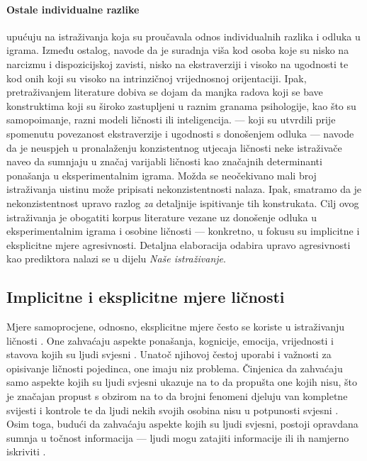 \documentclass[a4paper, 12pt]{report}
\begin{document}
\paragraph{Ostale individualne razlike}  upućuju na 
istraživanja koja su proučavala odnos individualnih
razlika i odluka u igrama. Između ostalog, navode da je suradnja viša kod osoba koje su nisko na
narcizmu i dispozicijskoj zavisti, nisko na ekstraverziji i visoko na ugodnosti
te kod onih koji su visoko na intrinzičnoj vrijednosnoj orijentaciji. Ipak,
pretraživanjem literature dobiva se dojam da manjka radova koji se bave
konstruktima koji su široko zastupljeni u raznim granama psihologije,
kao što su samopoimanje, razni modeli ličnosti ili inteligencija. 
\citet{koole2001social} --- koji su
utvrdili prije spomenutu povezanost ekstraverzije i ugodnosti s donošenjem
odluka --- navode da je neuspjeh u pronalaženju konzistentnog utjecaja ličnosti
neke istraživače naveo da sumnjaju u značaj varijabli ličnosti kao značajnih
determinanti ponašanja u eksperimentalnim igrama. Možda se neočekivano mali broj istraživanja
uistinu može pripisati nekonzistentnosti nalaza. Ipak, smatramo da je
nekonzistentnost upravo razlog \emph{za} detaljnije ispitivanje tih konstrukata.
Cilj ovog istraživanja je obogatiti korpus literature vezane uz donošenje odluka
u eksperimentalnim igrama
i osobine ličnosti --- konkretno, u fokusu su implicitne i eksplicitne
mjere agresivnosti. Detaljna elaboracija odabira upravo agresivnosti kao
prediktora nalazi se u dijelu \emph{Naše istraživanje}.

\subsection{Implicitne i eksplicitne mjere ličnosti}

Mjere samoprocjene, odnosno, eksplicitne mjere često se koriste u
istraživanju ličnosti \citep{wileyhandzgal}. One zahvaćaju aspekte ponašanja,
kognicije, emocija, vrijednosti i
stavova kojih su ljudi svjesni \citep{lebretsubclin}. 
Unatoč njihovoj čestoj uporabi i
važnosti za opisivanje ličnosti pojedinca, one imaju niz problema. 
Činjenica da zahvaćaju samo aspekte kojih su ljudi svjesni ukazuje na to da
propušta one kojih nisu, što je značajan propust s obzirom na to da brojni
fenomeni djeluju van kompletne svijesti i kontrole te da ljudi nekih svojih
osobina nisu u potpunosti svjesni \citep{uhlmann2012getting, wileyhandzgal, aamondt2009org}.
Osim toga, budući da zahvaćaju aspekte kojih su ljudi svjesni, postoji opravdana
sumnja u točnost informacija --- ljudi mogu zatajiti informacije ili ih namjerno
iskriviti \citep{wileyhandzgal}. 
\end{document}

